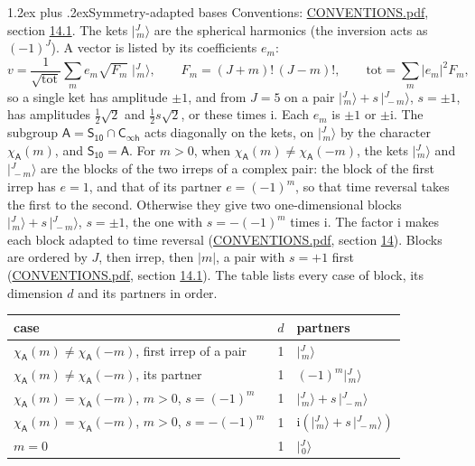 \documentclass[10pt,a4paper]{article}
\makeatletter
\renewcommand\section{\@startsection{section}{1}{\z@}{-3ex plus -1ex minus -.2ex}%
  {1.2ex plus .2ex}{\normalfont\large\sffamily\bfseries\color{parttitle}}}
\numberwithin{equation}{section}
\newcommand{\grp}[1]{\mathsf{#1}}
\newcommand{\iunit}{\mathrm{i}}
\newcommand{\chiA}{\chi_{\grp{A}}}
\newcommand{\jm}[2]{\bigl\lvert{}^{#1}_{\,#2}\bigr\rangle}
\makeatother
\begin{document}
\section{Symmetry-adapted bases}\label{s:bases}
Conventions: \href{../../CONVENTIONS.pdf}{CONVENTIONS.pdf}, section \href{../../CONVENTIONS.pdf\#conv.14.1}{14.1}.
\leavevmode\label{n:index.m}\label{n:vector.ket}The kets $\jm{J}{m}$ are the spherical harmonics (the inversion acts as $(-1)^J$). \label{n:index.ketcoefficient}\label{n:vector.basis.symmetry}\label{n:index.ketweight}\label{n:index.total}A vector is listed by its coefficients $e_m$:
\begin{equation}\label{e:ket}v = \frac{1}{\sqrt{\mathrm{tot}}}\sum_m e_m\sqrt{F_m}\;\jm{J}{m},\qquad F_m = (J+m)!\,(J-m)!,\qquad \mathrm{tot} = \sum_m |e_m|^2F_m,\end{equation}
\leavevmode\label{n:index.pair.sign}so a single ket has amplitude $\pm1$, and from $J = 5$ on a pair $\jm{J}{m} + s\,\jm{J}{-m}$, $s = \pm1$, has amplitudes $\tfrac{1}{2}\sqrt{2}$ and $\tfrac{1}{2}s\sqrt{2}$, or these times $\iunit$. Each $e_m$ is $\pm1$ or $\pm\iunit$.
\leavevmode\label{n:group.A}\label{n:function.character.abelian}The subgroup $\grp{A} = \grp{S_{10}}\cap\grp{C_{\infty h}}$ acts diagonally on the kets, on $\jm{J}{m}$ by the character $\chiA(m)$, and $\grp{S_{10}} = \grp{A}$. For $m > 0$, when $\chiA(m) \ne \chiA(-m)$, the kets $\jm{J}{m}$ and $\jm{J}{-m}$ are the blocks of the two irreps of a complex pair: the block of the first irrep has $e = 1$, and that of its partner $e = (-1)^m$, so that time reversal takes the first to the second. Otherwise they give two one-dimensional blocks $\jm{J}{m} + s\,\jm{J}{-m}$, $s = \pm1$, the one with $s = -(-1)^m$ times $\iunit$. The factor $\iunit$ makes each block adapted to time reversal (\href{../../CONVENTIONS.pdf}{CONVENTIONS.pdf}, section \href{../../CONVENTIONS.pdf\#conv.14}{14}). Blocks are ordered by $J$, then irrep, then $|m|$, a pair with $s = +1$ first (\href{../../CONVENTIONS.pdf}{CONVENTIONS.pdf}, section \href{../../CONVENTIONS.pdf\#conv.14.1}{14.1}).
\leavevmode\label{n:head.case}\label{n:head.partners}The table lists every case of block, its dimension $d$ and its partners in order.
\begin{center}\begin{tabular}{@{}lrl@{}}\toprule
case & $d$ & partners\\\midrule
$\chiA(m) \ne \chiA(-m)$, first irrep of a pair & 1 & $\jm{J}{m}$\\
$\chiA(m) \ne \chiA(-m)$, its partner & 1 & $(-1)^m\jm{J}{m}$\\
$\chiA(m) = \chiA(-m)$, $m > 0$, $s = (-1)^m$ & 1 & $\jm{J}{m} + s\,\jm{J}{-m}$\\
$\chiA(m) = \chiA(-m)$, $m > 0$, $s = -(-1)^m$ & 1 & $\iunit(\jm{J}{m} + s\,\jm{J}{-m})$\\
$m = 0$ & 1 & $\jm{J}{0}$\\
\bottomrule\end{tabular}\end{center}
\end{document}
